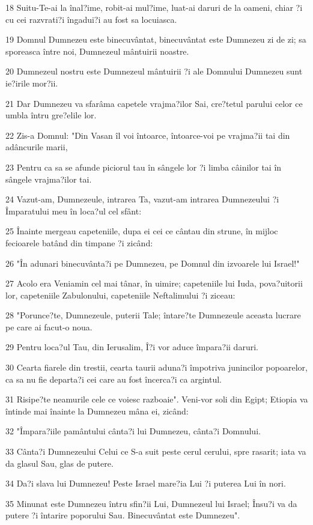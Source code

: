 \par 18 Suitu-Te-ai la înal?ime, robit-ai mul?ime, luat-ai daruri de la oameni, chiar ?i cu cei razvrati?i îngadui?i au fost sa locuiasca.
\par 19 Domnul Dumnezeu este binecuvântat, binecuvântat este Dumnezeu zi de zi; sa sporeasca între noi, Dumnezeul mântuirii noastre.
\par 20 Dumnezeul nostru este Dumnezeul mântuirii ?i ale Domnului Dumnezeu sunt ie?irile mor?ii.
\par 21 Dar Dumnezeu va sfarâma capetele vrajma?ilor Sai, cre?tetul parului celor ce umbla întru gre?elile lor.
\par 22 Zis-a Domnul: "Din Vasan îl voi întoarce, întoarce-voi pe vrajma?ii tai din adâncurile marii,
\par 23 Pentru ca sa se afunde piciorul tau în sângele lor ?i limba câinilor tai în sângele vrajma?ilor tai.
\par 24 Vazut-am, Dumnezeule, intrarea Ta, vazut-am intrarea Dumnezeului ?i Împaratului meu în loca?ul cel sfânt:
\par 25 Înainte mergeau capeteniile, dupa ei cei ce cântau din strune, în mijloc fecioarele batând din timpane ?i zicând:
\par 26 "În adunari binecuvânta?i pe Dumnezeu, pe Domnul din izvoarele lui Israel!"
\par 27 Acolo era Veniamin cel mai tânar, în uimire; capeteniile lui Iuda, pova?uitorii lor, capeteniile Zabulonului, capeteniile Neftalimului ?i ziceau:
\par 28 "Porunce?te, Dumnezeule, puterii Tale; întare?te Dumnezeule aceasta lucrare pe care ai facut-o noua.
\par 29 Pentru loca?ul Tau, din Ierusalim, Î?i vor aduce împara?ii daruri.
\par 30 Cearta fiarele din trestii, cearta taurii aduna?i împotriva junincilor popoarelor, ca sa nu fie departa?i cei care au fost încerca?i ca argintul.
\par 31 Risipe?te neamurile cele ce voiesc razboaie". Veni-vor soli din Egipt; Etiopia va întinde mai înainte la Dumnezeu mâna ei, zicând:
\par 32 "Împara?iile pamântului cânta?i lui Dumnezeu, cânta?i Domnului.
\par 33 Cânta?i Dumnezeului Celui ce S-a suit peste cerul cerului, spre rasarit; iata va da glasul Sau, glas de putere.
\par 34 Da?i slava lui Dumnezeu! Peste Israel mare?ia Lui ?i puterea Lui în nori.
\par 35 Minunat este Dumnezeu întru sfin?ii Lui, Dumnezeul lui Israel; Însu?i va da putere ?i întarire poporului Sau. Binecuvântat este Dumnezeu".

